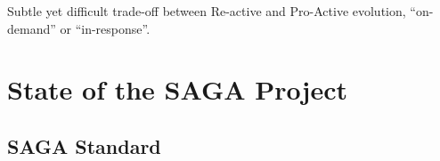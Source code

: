 \documentclass{article}
\newcommand{\I}[1]{\textit{#1}}
\newcommand{\B}[1]{\textbf{#1}}
\newcommand{\todo}[1]{{\textcolor{red}{\B{TODO:} #1 }}}
\newcommand{\jhanote}[1]{{\textcolor{red}{     \B{Shantenu:} #1 }}}
\newcommand{\jhanote}[1]{}
\begin{document}
Subtle yet difficult trade-off between Re-active and Pro-Active
evolution, ``on-demand'' or ``in-response''.



  


\section{State of the SAGA Project}
\label{sec:state}


\subsection{SAGA Standard}
 
\end{document}
